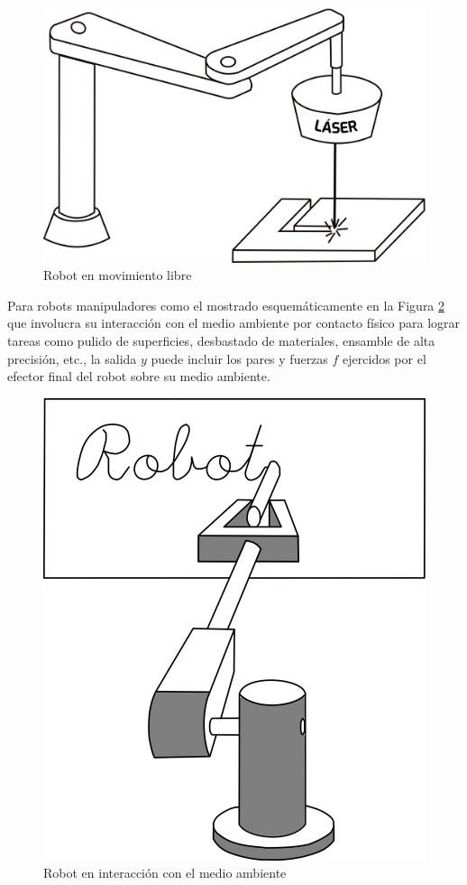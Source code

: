 \begin{figure}[h!]
	\centering
	\includegraphics[scale=0.4]{Capitulo3/figs/robotLaser.png} 
	\caption{Robot en movimiento libre}
	\label{laser}
\end{figure}

Para robots manipuladores como el mostrado esquemáticamente en la Figura \ref{gis} que involucra su interacción con el medio ambiente por contacto físico para lograr tareas como pulido de superficies, desbastado de materiales, ensamble de alta precisión, etc., la salida $\boldsymbol{\mathit{y}}$ puede incluir los pares y fuerzas $\boldsymbol{\mathit{f}}$ ejercidos por el efector final del robot sobre su medio ambiente.
\\

\begin{figure}[h!]
	\centering
	\includegraphics[scale=0.75]{Capitulo3/figs/robotGis.png} 
	\caption{Robot en interacción con el medio ambiente}
	\label{gis}
\end{figure}

